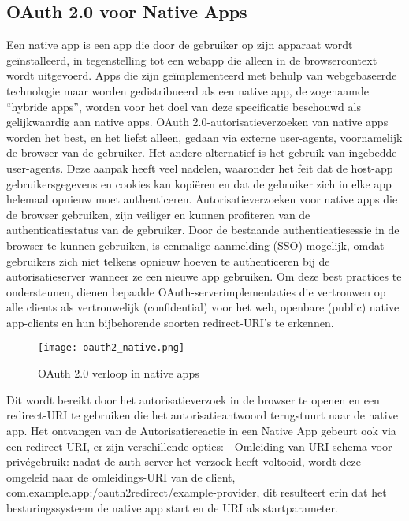 \subsection{OAuth 2.0 voor Native Apps}%
\label{subsec:oauth-2.0-voor-native-apps}
\autocite{Denniss2017}
Een native app is een app die door de gebruiker op zijn apparaat wordt geïnstalleerd, in tegenstelling tot een webapp die alleen in de browsercontext wordt uitgevoerd. Apps die zijn geïmplementeerd met behulp van webgebaseerde technologie maar worden gedistribueerd als een native app, de zogenaamde ``hybride apps'', worden voor het doel van deze specificatie beschouwd als gelijkwaardig aan native apps.
OAuth 2.0-autorisatieverzoeken van native apps worden het best, en het liefst alleen, gedaan via externe user-agents, voornamelijk de browser van de gebruiker. Het andere alternatief is het gebruik van ingebedde user-agents. Deze aanpak heeft veel nadelen, waaronder het feit dat de host-app gebruikersgegevens en cookies kan kopiëren en dat de gebruiker zich in elke app helemaal opnieuw moet authenticeren. Autorisatieverzoeken voor native apps die de browser gebruiken, zijn veiliger en kunnen profiteren van de authenticatiestatus van de gebruiker. Door de bestaande authenticatiesessie in de browser te kunnen gebruiken, is eenmalige aanmelding (SSO) mogelijk, omdat gebruikers zich niet telkens opnieuw hoeven te authenticeren bij de autorisatieserver wanneer ze een nieuwe app gebruiken.
Om deze best practices te ondersteunen, dienen bepaalde OAuth-serverimplementaties die vertrouwen op alle clients als vertrouwelijk (confidential) voor het web, openbare (public) native app-clients en hun bijbehorende soorten redirect-URI's te erkennen.
\begin{figure}[h]
  \centering
  \texttt{[image: oauth2\_native.png]}
  \caption{OAuth 2.0 verloop in native apps}
  \label{fig:example2}
\end{figure}
\newline
Dit wordt bereikt door het autorisatieverzoek in de browser te openen en een redirect-URI te gebruiken die het autorisatieantwoord terugstuurt naar de native app.
\newline
\newline
Het ontvangen van de Autorisatiereactie in een Native App gebeurt ook via een redirect URI, er zijn verschillende opties:
\newline
- Omleiding van URI-schema voor privégebruik: nadat de auth-server het verzoek heeft voltooid, wordt deze omgeleid naar de omleidings-URI van de client, com.example.app:/oauth2redirect/example-provider, dit resulteert erin dat het besturingssysteem de native app start en de URI als startparameter.

